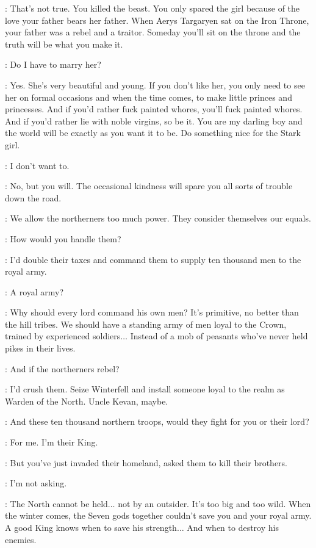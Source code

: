 \CERSEI: That's not true. You killed the beast. You only spared the girl because of the love your father bears her father. When Aerys Targaryen sat on the Iron Throne, your father was a rebel and a traitor. Someday you'll sit on the throne and the truth will be what you make it. 

\JOFFREY: Do I have to marry her? 

\CERSEI: Yes. She's very beautiful and young. If you don't like her, you only need to see her on formal occasions and when the time comes, to make little princes and princesses. And if you'd rather fuck painted whores, you'll fuck painted whores. And if you'd rather lie with noble virgins, so be it. You are my darling boy and the world will be exactly as you want it to be. Do something nice for the Stark girl. 

\JOFFREY: I don't want to. 

\CERSEI: No, but you will. The occasional kindness will spare you all sorts of trouble down the road. 

\JOFFREY: We allow the northerners too much power. They consider themselves our equals. 

\CERSEI: How would you handle them? 

\JOFFREY: I'd double their taxes and command them to supply ten thousand men to the royal army. 

\CERSEI: A royal army? 

\JOFFREY: Why should every lord command his own men? It's primitive, no better than the hill tribes. We should have a standing army of men loyal to the Crown, trained by experienced soldiers$\ldots$ Instead of a mob of peasants who've never held pikes in their lives. 

\CERSEI: And if the northerners rebel? 

\JOFFREY: I'd crush them. Seize Winterfell and install someone loyal to the realm as Warden of the North. Uncle Kevan, maybe. 

\CERSEI: And these ten thousand northern troops, would they fight for you or their lord? 

\JOFFREY: For me. I'm their King. 

\CERSEI: But you've just invaded their homeland, asked them to kill their brothers. 

\JOFFREY: I'm not asking. 

\CERSEI: The North cannot be held$\ldots$ not by an outsider. It's too big and too wild. When the winter comes, the Seven gods together couldn't save you and your royal army. A good King knows when to save his strength$\ldots$ And when to destroy his enemies. 

